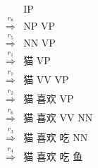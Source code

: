 

\begin{minipage}[t]{0.38\linewidth}
{\small
\begin{eqnarray}
& &\textrm{IP} \nonumber \\
& \overset{r_8}{\Rightarrow} & \textrm{NP VP} \nonumber \\
& \overset{r_5}{\Rightarrow} & \textrm{NN VP} \nonumber \\
& \overset{r_1}{\Rightarrow} & \textrm{猫 VP} \nonumber \\
& \overset{r_7}{\Rightarrow} & \textrm{猫 VV VP} \nonumber \\
& \overset{r_2}{\Rightarrow} & \textrm{猫 喜欢 VP} \nonumber \\
& \overset{r_6}{\Rightarrow} & \textrm{猫 喜欢 VV NN} \nonumber \\
& \overset{r_3}{\Rightarrow} & \textrm{猫 喜欢 吃 NN} \nonumber \\
& \overset{r_4}{\Rightarrow} & \textrm{猫 喜欢 吃 鱼} \nonumber 
\end{eqnarray}
}
\end{minipage}
\hfill
